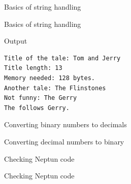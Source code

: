 \documentclass[usenames,dvipsnames,aspectratio=169]{beamer}
\begin{document}
\begin{frame}{Basics of string handling}
  \begin{exampleblock}{}
    \scriptsize
    
  \end{exampleblock}
\end{frame}

\begin{frame}[fragile]{Basics of string handling}
  \begin{block}{Output}
    \begin{verbatim}
Title of the tale: Tom and Jerry
Title length: 13
Memory needed: 128 bytes.
Another tale: The Flinstones
Not funny: The Gerry
The follows Gerry.
\end{verbatim}
  \end{block}
\end{frame}

\begin{frame}{Converting binary numbers to decimals}
  \begin{exampleblock}{}
    \scriptsize
    
  \end{exampleblock}
\end{frame}

\begin{frame}{Converting decimal numbers to binary}
  \begin{exampleblock}{}
    \scriptsize
    \vspace{-.3cm}
    
    \vspace{-.3cm}
  \end{exampleblock}
\end{frame}

\begin{frame}{Checking Neptun code}
  \begin{exampleblock}{}
    \tiny
    \vspace{-.3cm}
    
    \vspace{-.3cm}
  \end{exampleblock}
\end{frame}

\begin{frame}{Checking Neptun code}
    \begin{exampleblock}{}
    \tiny
    \vspace{-.3cm}
    
    \vspace{-.3cm}
  \end{exampleblock}
\end{frame}
\end{document}
